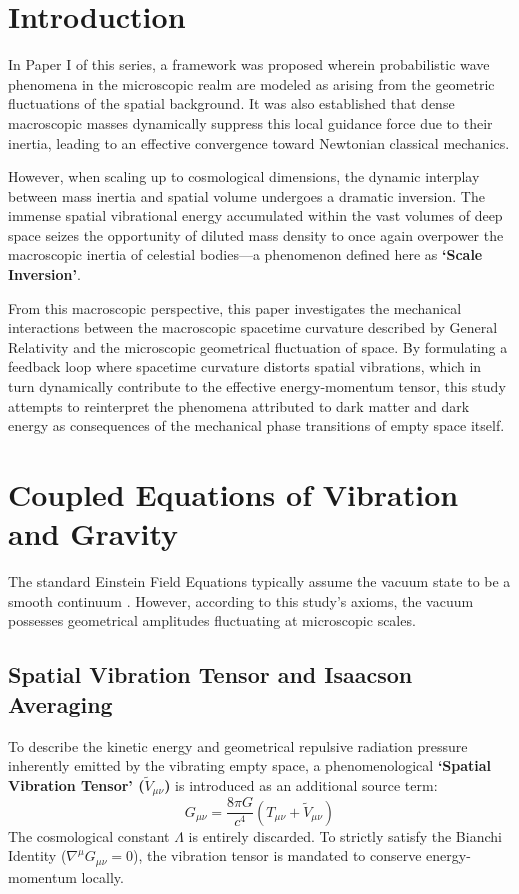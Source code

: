 \documentclass[reprint,amsmath,amssymb,aps,prd]{revtex4-2}
\begin{document}
\section{Introduction}
In Paper I of this series, a framework was proposed wherein probabilistic wave phenomena in the microscopic realm are modeled as arising from the geometric fluctuations of the spatial background. It was also established that dense macroscopic masses dynamically suppress this local guidance force due to their inertia, leading to an effective convergence toward Newtonian classical mechanics.

However, when scaling up to cosmological dimensions, the dynamic interplay between mass inertia and spatial volume undergoes a dramatic inversion. The immense spatial vibrational energy accumulated within the vast volumes of deep space seizes the opportunity of diluted mass density to once again overpower the macroscopic inertia of celestial bodies---a phenomenon defined here as \textbf{`Scale Inversion'}.

From this macroscopic perspective, this paper investigates the mechanical interactions between the macroscopic spacetime curvature described by General Relativity and the microscopic geometrical fluctuation of space. By formulating a feedback loop where spacetime curvature distorts spatial vibrations, which in turn dynamically contribute to the effective energy-momentum tensor, this study attempts to reinterpret the phenomena attributed to dark matter and dark energy as consequences of the mechanical phase transitions of empty space itself.

\section{Coupled Equations of Vibration and Gravity}
The standard Einstein Field Equations typically assume the vacuum state to be a smooth continuum \cite{Einstein1916}. However, according to this study's axioms, the vacuum possesses geometrical amplitudes fluctuating at microscopic scales.

\subsection{Spatial Vibration Tensor and Isaacson Averaging}
To describe the kinetic energy and geometrical repulsive radiation pressure inherently emitted by the vibrating empty space, a phenomenological \textbf{`Spatial Vibration Tensor' ($\tilde{V}_{\mu\nu}$)} is introduced as an additional source term:
\begin{equation}
G_{\mu\nu} = \frac{8\pi G}{c^4} \left( T_{\mu\nu} + \tilde{V}_{\mu\nu} \right)
\end{equation}
The cosmological constant $\Lambda$ is entirely discarded. To strictly satisfy the Bianchi Identity ($\nabla^\mu G_{\mu\nu} = 0$), the vibration tensor is mandated to conserve energy-momentum locally. 
\end{document}
